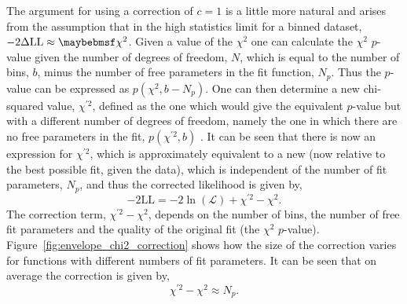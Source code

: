 The argument for using a correction of $c=1$ is a little more natural and arises from the assumption that in the high statistics limit for a binned dataset, $\NLL\approx\chi^{2}$. Given a value of the $\chi^{2}$ one can calculate the $\chi^{2}$ $p$-value given the number of degrees of freedom, $N$, which is equal to the number of bins, $b$, minus the number of free parameters in the fit function, $N_{p}$. Thus the $p$-value can be expressed as $p(\chi^{2},b-N_{p})$. One can then determine a new chi-squared value, $\chi^{\prime 2}$, defined as the one which would give the equivalent $p$-value but with a different number of degrees of freedom, namely the one in which there are no free parameters in the fit, $p(\chi^{\prime 2},b)$ . It can be seen that there is now an expression for $\chi^{\prime 2}$, which is approximately equivalent to a new \NLL (now relative to the best possible fit, given the data), which is independent of the number of fit parameters, $N_{p}$, and thus the corrected likelihood is given by,
\begin{equation}
  -2\mathrm{LL} = -2\ln(\mathcal{L}) + \chi^{\prime 2} - \chi^{2}.
\end{equation}
The correction term, $\chi^{\prime 2} -\chi^{2}$, depends on the number of bins, the number of free fit parameters and the quality of the original fit (the $\chi^{2}$ $p$-value). Figure~\ref{fig:envelope_chi2_correction} shows how the size of the correction varies for functions with different numbers of fit parameters. It can be seen that on average the correction is given by,
\begin{equation}
  \chi^{\prime 2} - \chi^{2} \approx N_{p}.
\end{equation}
